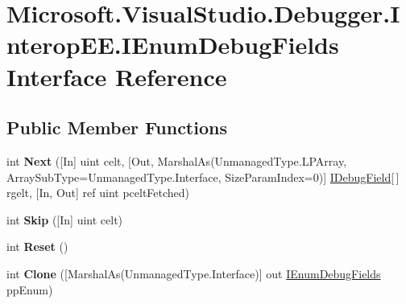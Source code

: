 \hypertarget{interface_microsoft_1_1_visual_studio_1_1_debugger_1_1_interop_e_e_1_1_i_enum_debug_fields}{\section{Microsoft.\+Visual\+Studio.\+Debugger.\+Interop\+E\+E.\+I\+Enum\+Debug\+Fields Interface Reference}
\label{interface_microsoft_1_1_visual_studio_1_1_debugger_1_1_interop_e_e_1_1_i_enum_debug_fields}
}
\subsection*{Public Member Functions}
\begin{DoxyCompactItemize}
\item 
\hypertarget{interface_microsoft_1_1_visual_studio_1_1_debugger_1_1_interop_e_e_1_1_i_enum_debug_fields_a332d68c47550c3e7071ea57df07521e3}{int {\bfseries Next} (\mbox{[}In\mbox{]} uint celt, \mbox{[}Out, Marshal\+As(Unmanaged\+Type.\+L\+P\+Array, Array\+Sub\+Type=Unmanaged\+Type.\+Interface, Size\+Param\+Index=0)\mbox{]} \hyperlink{interface_microsoft_1_1_visual_studio_1_1_debugger_1_1_interop_e_e_1_1_i_debug_field}{I\+Debug\+Field}\mbox{[}$\,$\mbox{]} rgelt, \mbox{[}In, Out\mbox{]} ref uint pcelt\+Fetched)}\label{interface_microsoft_1_1_visual_studio_1_1_debugger_1_1_interop_e_e_1_1_i_enum_debug_fields_a332d68c47550c3e7071ea57df07521e3}

\item 
\hypertarget{interface_microsoft_1_1_visual_studio_1_1_debugger_1_1_interop_e_e_1_1_i_enum_debug_fields_a65bae99b11da279f84526c38353e58ef}{int {\bfseries Skip} (\mbox{[}In\mbox{]} uint celt)}\label{interface_microsoft_1_1_visual_studio_1_1_debugger_1_1_interop_e_e_1_1_i_enum_debug_fields_a65bae99b11da279f84526c38353e58ef}

\item 
\hypertarget{interface_microsoft_1_1_visual_studio_1_1_debugger_1_1_interop_e_e_1_1_i_enum_debug_fields_a2907fe1f1a6689423678725c3be2834a}{int {\bfseries Reset} ()}\label{interface_microsoft_1_1_visual_studio_1_1_debugger_1_1_interop_e_e_1_1_i_enum_debug_fields_a2907fe1f1a6689423678725c3be2834a}

\item 
\hypertarget{interface_microsoft_1_1_visual_studio_1_1_debugger_1_1_interop_e_e_1_1_i_enum_debug_fields_a726bd4b6cbc67033bfbfcd120ef17c9a}{int {\bfseries Clone} (\mbox{[}Marshal\+As(Unmanaged\+Type.\+Interface)\mbox{]} out \hyperlink{interface_microsoft_1_1_visual_studio_1_1_debugger_1_1_interop_e_e_1_1_i_enum_debug_fields}{I\+Enum\+Debug\+Fields} pp\+Enum)}\label{interface_microsoft_1_1_visual_studio_1_1_debugger_1_1_interop_e_e_1_1_i_enum_debug_fields_a726bd4b6cbc67033bfbfcd120ef17c9a}


\end{DoxyCompactItemize}
